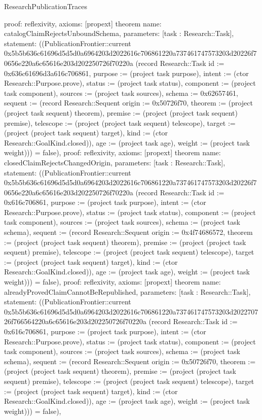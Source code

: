 \begin{lexlean}{ResearchPublicationTraces}
\begin{semanticmodule}
{ proof: reflexivity{},
 axioms: [propext]
}
theorem{
 name: catalogClaimRejectsUnboundSchema,
 parameters: [task : Research::Task],
 statement: ((PublicationFrontier::current 0x5b5b636c61696d5d5d0a6964203d2022616c706861220a737461747573203d20226f70656e220a6c65616e203d202250726f70220a (record Research::Task {id := 0x636c61696d3a616c706861, purpose := (project task purpose), intent := (ctor Research::Purpose.prove), status := (project task status), component := (project task component), sources := (project task sources), schema := 0x62657461, sequent := (record Research::Sequent {origin := 0x50726f70, theorem := (project (project task sequent) theorem), premise := (project (project task sequent) premise), telescope := (project (project task sequent) telescope), target := (project (project task sequent) target), kind := (ctor Research::GoalKind.closed)}), age := (project task age), weight := (project task weight)})) = false),
 proof: reflexivity{},
 axioms: [propext]
}
theorem{
 name: closedClaimRejectsChangedOrigin,
 parameters: [task : Research::Task],
 statement: ((PublicationFrontier::current 0x5b5b636c61696d5d5d0a6964203d2022616c706861220a737461747573203d20226f70656e220a6c65616e203d202250726f70220a (record Research::Task {id := 0x616c706861, purpose := (project task purpose), intent := (ctor Research::Purpose.prove), status := (project task status), component := (project task component), sources := (project task sources), schema := (project task schema), sequent := (record Research::Sequent {origin := 0x4f74686572, theorem := (project (project task sequent) theorem), premise := (project (project task sequent) premise), telescope := (project (project task sequent) telescope), target := (project (project task sequent) target), kind := (ctor Research::GoalKind.closed)}), age := (project task age), weight := (project task weight)})) = false),
 proof: reflexivity{},
 axioms: [propext]
}
theorem{
 name: alreadyProvedClaimCannotBeRepublished,
 parameters: [task : Research::Task],
 statement: ((PublicationFrontier::current 0x5b5b636c61696d5d5d0a6964203d2022616c706861220a737461747573203d202270726f766564220a6c65616e203d202250726f70220a (record Research::Task {id := 0x616c706861, purpose := (project task purpose), intent := (ctor Research::Purpose.prove), status := (project task status), component := (project task component), sources := (project task sources), schema := (project task schema), sequent := (record Research::Sequent {origin := 0x50726f70, theorem := (project (project task sequent) theorem), premise := (project (project task sequent) premise), telescope := (project (project task sequent) telescope), target := (project (project task sequent) target), kind := (ctor Research::GoalKind.closed)}), age := (project task age), weight := (project task weight)})) = false),
}
\end{semanticmodule}
\end{lexlean}

